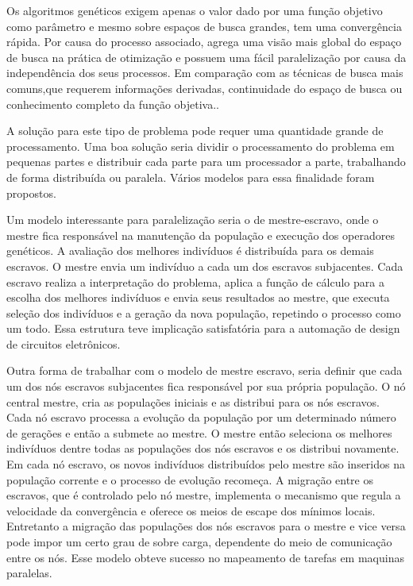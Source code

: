 Os algoritmos genéticos exigem apenas o valor dado por uma função objetivo como parâmetro e mesmo sobre espaços de busca grandes, tem uma convergência rápida. Por causa do processo associado, agrega uma visão mais global do espaço de busca na prática de otimização e possuem uma fácil paralelização por causa da independência dos seus processos. Em comparação com as técnicas de busca mais comuns,que requerem informações derivadas, continuidade do espaço de busca ou conhecimento completo da função objetiva.\cite{Vilson}.

A solução para este tipo de problema pode requer uma quantidade grande de processamento. Uma boa solução seria dividir o processamento do problema em pequenas partes e distribuir cada parte para um processador a parte, trabalhando de forma distribuída ou paralela. Vários modelos para essa finalidade foram propostos.

Um modelo interessante para paralelização seria o de mestre-escravo, onde o mestre fica responsável na manutenção da população e execução dos operadores genéticos. A avaliação dos melhores indivíduos é distribuída para os demais escravos. O mestre envia um indivíduo a cada um dos escravos subjacentes. Cada escravo realiza a interpretação do problema, aplica a função de cálculo para a escolha dos melhores indivíduos e envia seus resultados ao mestre, que executa seleção dos indivíduos e a geração da nova população, repetindo o processo como um todo. Essa estrutura teve implicação satisfatória para a automação de design de circuitos eletrônicos. \cite{Jason}

Outra forma de trabalhar com o modelo de mestre escravo, seria definir que cada um dos nós escravos subjacentes fica responsável por sua própria população. O nó central mestre, cria as populações iniciais e as distribui para os nós escravos. Cada nó escravo processa a evolução da população por um determinado número de gerações e então a submete ao mestre. O mestre então seleciona os melhores indivíduos dentre todas as populações dos nós escravos e os distribui novamente. Em cada nó escravo, os novos indivíduos distribuídos pelo mestre são inseridos na população corrente e o processo de evolução recomeça. A migração entre os escravos, que é controlado pelo nó mestre, implementa o mecanismo que regula a velocidade da convergência e oferece os meios de escape dos mínimos locais. Entretanto a migração das populações dos nós escravos para o mestre e vice versa pode impor um certo grau de sobre carga, dependente do meio de comunicação entre os nós. Esse modelo obteve sucesso no mapeamento de tarefas em maquinas paralelas. \cite{Alaoui}


